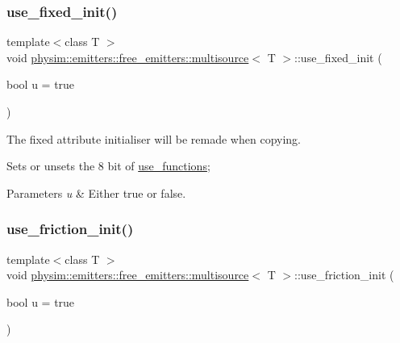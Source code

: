 \subsubsection{\texorpdfstring{use\+\_\+fixed\+\_\+init()}{use\_fixed\_init()}}
{\footnotesize\ttfamily template$<$class T $>$ \\
void \hyperlink{classphysim_1_1emitters_1_1free__emitters_1_1multisource}{physim\+::emitters\+::free\+\_\+emitters\+::multisource}$<$ T $>$\+::use\+\_\+fixed\+\_\+init (\begin{DoxyParamCaption}\item[{bool}]{u = {\ttfamily true} }\end{DoxyParamCaption})}



The fixed attribute initialiser will be remade when copying. 

Sets or unsets the 8 bit of \hyperlink{classphysim_1_1emitters_1_1free__emitters_1_1multisource_a99bad5ac0fb5cb14652bbfd0c1f0eeff}{use\+\_\+functions}; 
\begin{DoxyParams}{Parameters}
{\em u} & Either true or false. \\
\hline
\end{DoxyParams}
\mbox{\label{classphysim_1_1emitters_1_1free__emitters_1_1multisource_adae750ba93adee9a299e9f83735fe79e}} 
\subsubsection{\texorpdfstring{use\+\_\+friction\+\_\+init()}{use\_friction\_init()}}
{\footnotesize\ttfamily template$<$class T $>$ \\
void \hyperlink{classphysim_1_1emitters_1_1free__emitters_1_1multisource}{physim\+::emitters\+::free\+\_\+emitters\+::multisource}$<$ T $>$\+::use\+\_\+friction\+\_\+init (\begin{DoxyParamCaption}\item[{bool}]{u = {\ttfamily true} }\end{DoxyParamCaption})}



